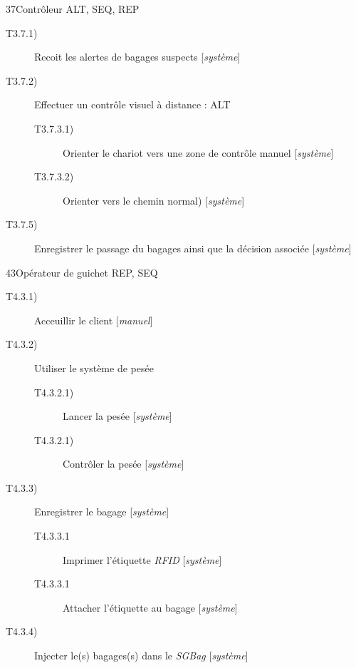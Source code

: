 {\begin{description}
\dta
{3}{7}{Contrôleur}
{ALT, SEQ, REP}
{
\begin{description}
	\item [T3.7.1)] Recoit les alertes de bagages suspects [\textsl{système}]
	\item [T3.7.2)] Effectuer un contrôle visuel à distance : ALT
	\begin{description}
		\item [T3.7.3.1)] Orienter le chariot vers une zone de contrôle manuel [\textsl{système}]
		\item [T3.7.3.2)] Orienter vers le chemin \og normal\fg) [\textsl{système}]
	\end{description}
	\item [T3.7.5)] Enregistrer le passage du bagages ainsi que la décision associée [\textsl{système}]
\end{description}
}

\dta
{4}{3}{Opérateur de guichet}
{REP, SEQ}
{
\begin{description}
	\item [T4.3.1)] Acceuillir le client [\textsl{manuel}]
	\item [T4.3.2)] Utiliser le système de pesée
	\begin{description}
		\item [T4.3.2.1)] Lancer la pesée [\textsl{système}]
		\item [T4.3.2.1)] Contrôler la pesée [\textsl{système}]
	\end{description}
	\item [T4.3.3)] Enregistrer le bagage [\textsl{système}]
	\begin{description}
		\item [T4.3.3.1] Imprimer l'étiquette \textsl{RFID} [\textsl{système}]
		\item [T4.3.3.1] Attacher l'étiquette au bagage [\textsl{système}]
	\end{description}
	\item [T4.3.4)] Injecter le(s) bagages(s) dans le \textsl{SGBag}  [\textsl{système}]
\end{description}
}


\end{description}}
